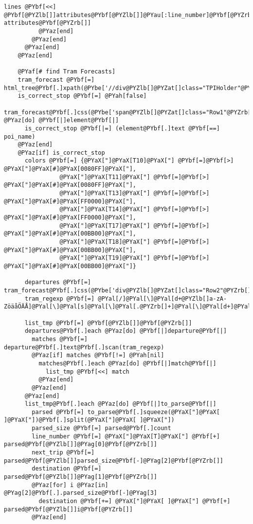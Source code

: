 \begin{Verbatim}[commandchars=@\[\]]
            lines @PYbf[<<] @PYbf[@PYZlb[]]attributes@PYbf[@PYZlb[]]@PYau[:line_number]@PYbf[@PYZrb[]], attributes@PYbf[@PYZrb[]]
          @PYaz[end]
        @PYaz[end]
      @PYaz[end]
    @PYaz[end]

    @PYaf[# find Tram Forecasts]
    tram_forecast @PYbf[=] html_tree@PYbf[.]xpath(@PYbe['//div@PYZlb[]@PYZat[]class="TPIHolder"@PYZrb[]'])
    is_correct_stop @PYbf[=] @PYah[false]
    tram_forecast@PYbf[.]css(@PYbe['span@PYZlb[]@PYZat[]class="Row1"@PYZrb[]'])@PYbf[.]each @PYaz[do] @PYbf[|]element@PYbf[|]
      is_correct_stop @PYbf[|=] (element@PYbf[.]text @PYbf[==] poi_name)
    @PYaz[end]
    @PYaz[if] is_correct_stop
      colors @PYbf[=] {@PYaX["]@PYaX[T10]@PYaX["] @PYbf[=]@PYbf[>] @PYaX["]@PYaX[#]@PYaX[0080FF]@PYaX["],
                @PYaX["]@PYaX[T11]@PYaX["] @PYbf[=]@PYbf[>] @PYaX["]@PYaX[#]@PYaX[0080FF]@PYaX["],
                @PYaX["]@PYaX[T13]@PYaX["] @PYbf[=]@PYbf[>] @PYaX["]@PYaX[#]@PYaX[FF0000]@PYaX["],
                @PYaX["]@PYaX[T14]@PYaX["] @PYbf[=]@PYbf[>] @PYaX["]@PYaX[#]@PYaX[FF0000]@PYaX["],
                @PYaX["]@PYaX[T17]@PYaX["] @PYbf[=]@PYbf[>] @PYaX["]@PYaX[#]@PYaX[00BB00]@PYaX["],
                @PYaX["]@PYaX[T18]@PYaX["] @PYbf[=]@PYbf[>] @PYaX["]@PYaX[#]@PYaX[00BB00]@PYaX["],
                @PYaX["]@PYaX[T19]@PYaX["] @PYbf[=]@PYbf[>] @PYaX["]@PYaX[#]@PYaX[00BB00]@PYaX["]}
                
      departures @PYbf[=] tram_forecast@PYbf[.]css(@PYbe['div@PYZlb[]@PYZat[]class="Row2"@PYZrb[]'])
      tram_regexp @PYbf[=] @PYal[/]@PYal[\]@PYal[d+@PYZlb[]a-zA-ZöäåÖÄÅ]@PYal[\]@PYal[s]@PYal[\]@PYal[.@PYZrb[]+]@PYal[\]@PYal[d+]@PYal[\]@PYal[smin]@PYal[/]
      
      list_tmp @PYbf[=] @PYbf[@PYZlb[]]@PYbf[@PYZrb[]]
      departures@PYbf[.]each @PYaz[do] @PYbf[|]departure@PYbf[|]
        matches @PYbf[=] departure@PYbf[.]text@PYbf[.]scan(tram_regexp)
        @PYaz[if] matches @PYbf[!=] @PYah[nil]
          matches@PYbf[.]each @PYaz[do] @PYbf[|]match@PYbf[|]
            list_tmp @PYbf[<<] match
          @PYaz[end]
        @PYaz[end]
      @PYaz[end]
      list_tmp@PYbf[.]each @PYaz[do] @PYbf[|]to_parse@PYbf[|]
        parsed @PYbf[=] to_parse@PYbf[.]squeeze(@PYaX["]@PYaX[ ]@PYaX["])@PYbf[.]split(@PYaX["]@PYaX[ ]@PYaX["])
        parsed_size @PYbf[=] parsed@PYbf[.]count
        line_number @PYbf[=] @PYaX["]@PYaX[T]@PYaX["] @PYbf[+] parsed@PYbf[@PYZlb[]]@PYag[0]@PYbf[@PYZrb[]]
        next_trip @PYbf[=] parsed@PYbf[@PYZlb[]]parsed_size@PYbf[-]@PYag[2]@PYbf[@PYZrb[]]
        destination @PYbf[=] parsed@PYbf[@PYZlb[]]@PYag[1]@PYbf[@PYZrb[]]
        @PYaz[for] i @PYaz[in] @PYag[2]@PYbf[.].parsed_size@PYbf[-]@PYag[3]
          destination @PYbf[+=] @PYaX["]@PYaX[ ]@PYaX["] @PYbf[+] parsed@PYbf[@PYZlb[]]i@PYbf[@PYZrb[]]
        @PYaz[end]
        

\end{Verbatim}
